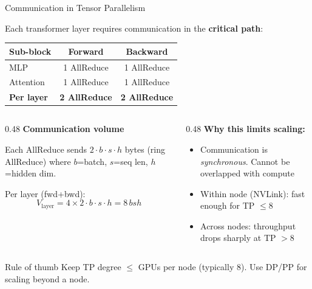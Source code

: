 \begin{frame}{Communication in Tensor Parallelism}

  Each transformer layer requires communication in the \textbf{critical path}:

  \vspace{0.3em}
  \begin{center}
  \begin{tabular}{l c c}
    \toprule
    \textbf{Sub-block} & \textbf{Forward} & \textbf{Backward} \\
    \midrule
    MLP       & 1 AllReduce & 1 AllReduce \\
    Attention & 1 AllReduce & 1 AllReduce \\
    \midrule
    \textbf{Per layer} & \textbf{2 AllReduce} & \textbf{2 AllReduce} \\
    \bottomrule
  \end{tabular}
  \end{center}

  \vspace{0.3em}
  \begin{columns}
    \begin{column}{0.48\textwidth}
      \textbf{Communication volume}\\[0.2em]
      {\small
        Each AllReduce sends $2 \cdot b \cdot s \cdot h$ bytes (ring AllReduce) where $b$=batch, $s$=seq len, $h$=hidden dim.

        \vspace{0.3em}
        Per layer (fwd+bwd):
        \[
          V_{\text{layer}} = 4 \times 2 \cdot b \cdot s \cdot h = 8\,bsh
        \]
      }
    \end{column}
    \begin{column}{0.48\textwidth}
      \textbf{Why this limits scaling:}
      \begin{itemize}
        \item Communication is \emph{synchronous}. Cannot be overlapped with compute
        \item Within node (NVLink): fast enough for TP $\leq 8$
        \item Across nodes: throughput drops sharply at TP $> 8$
      \end{itemize}
    \end{column}
  \end{columns}

  \vspace{0.3em}
  \begin{alertblock}{Rule of thumb}
    Keep TP degree $\leq$ GPUs per node (typically 8). Use DP/PP for scaling beyond a node.
  \end{alertblock}
\end{frame}

